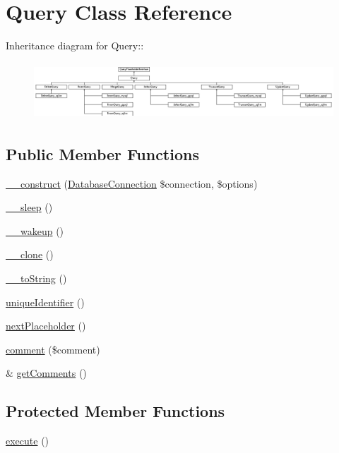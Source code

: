 \hypertarget{classQuery}{
\section{Query Class Reference}
\label{classQuery}
}
Inheritance diagram for Query::\begin{figure}[H]
\begin{center}
\leavevmode
\includegraphics[height=2.14559cm]{classQuery}
\end{center}
\end{figure}
\subsection*{Public Member Functions}
\begin{DoxyCompactItemize}
\item 
\hyperlink{classQuery_a3fae0cd122cc9f885ec035b5e47c0e5b}{\_\-\_\-construct} (\hyperlink{classDatabaseConnection}{DatabaseConnection} \$connection, \$options)
\item 
\hyperlink{classQuery_ab98e075cab6448bdade84475771210c4}{\_\-\_\-sleep} ()
\item 
\hyperlink{classQuery_a1c06bc497d594036c08805b71ce32d05}{\_\-\_\-wakeup} ()
\item 
\hyperlink{classQuery_a2a0fc84cd8f0b0ffd268de81ac2472c3}{\_\-\_\-clone} ()
\item 
\hyperlink{classQuery_a16c3a3265666b784d49ce18a6fda9a8a}{\_\-\_\-toString} ()
\item 
\hyperlink{classQuery_afa7ba2c63e278d4d585bd1ff70e0c237}{uniqueIdentifier} ()
\item 
\hyperlink{classQuery_a6932a635e623d74c7ae111742818b6b8}{nextPlaceholder} ()
\item 
\hyperlink{classQuery_a74f7d00d41c85568f37c828e20fcab32}{comment} (\$comment)
\item 
\& \hyperlink{classQuery_a263e8b3192c41971060533b78dcf3a4d}{getComments} ()
\end{DoxyCompactItemize}
\subsection*{Protected Member Functions}
\begin{DoxyCompactItemize}
\item 
\hyperlink{classQuery_a9f2326187a94f3337a7838687b1e6929}{execute} ()
\end{DoxyCompactItemize}
